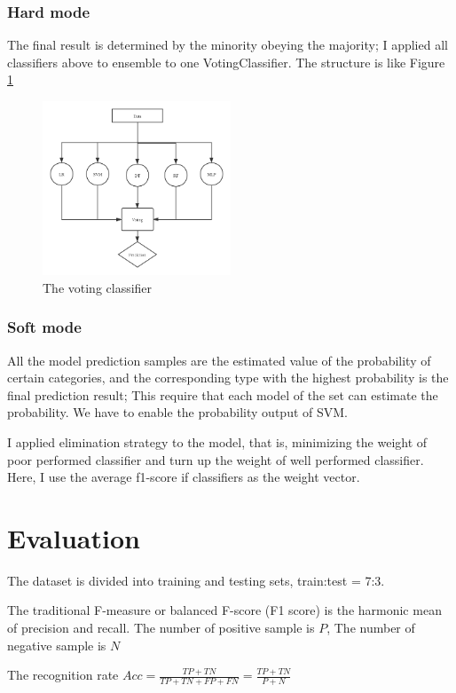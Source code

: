 \documentclass[11pt,en]{elegantpaper}
\begin{document}
\subsubsection{Hard mode}
The final result is determined by the minority obeying the majority; I applied all classifiers above to ensemble to one VotingClassifier. The structure is like Figure \ref{vcl}
\begin{figure}[h]
	\centering
	\includegraphics[width=0.5\textwidth]{image/voting}
	\caption{The voting classifier}
	\label{vcl}
\end{figure}


\subsubsection{Soft mode}
All the model prediction samples are the estimated value of the probability of certain categories, and the corresponding type with the highest probability is the final prediction result; This require that each model of the set can estimate the probability. We have to enable the probability output of SVM.

I applied elimination strategy to the model, that is, minimizing the weight of poor performed classifier and turn up the weight of well performed classifier. Here, I use the average f1-score if classifiers as the weight vector.

\section{Evaluation}
The dataset is divided into training and testing sets, train:test = 7:3.

The traditional F-measure or balanced F-score (F1 score) is the harmonic mean of precision and recall.
The number of positive sample is $P$, The number of negative sample is $N$

The recognition rate $Acc=\frac{TP+TN}{TP+TN+FP+FN}=\frac{TP+TN}{P+N}$
\end{document}
